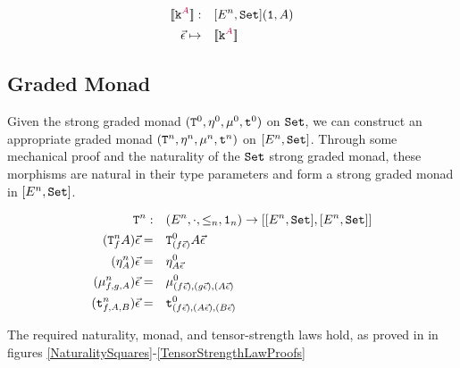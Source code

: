     \begin{align*}
        {\bf [\![}\texttt{k}^{\color{purple} A}{\bf ]\!]}:&\quad[E^n, \texttt{Set}](\texttt{1}, A)\\
        \vec{\epsilon}\mapsto&\quad{\bf [\![}\texttt{k}^{\color{purple} A}{\bf ]\!]}
    \end{align*}
    
    \subsection{Graded Monad}\label{NaturalityAndMonadLawsProof}
    Given the strong graded monad $(\texttt{T}^0_{}, \eta_{}^0{}{}, \mu^0, \texttt{t}^0)$ on $\texttt{Set}$, we can construct an appropriate graded monad $(\texttt{T}^n_{}, \eta_{}^n{}{}, \mu^n,\texttt{t}^n)$ on $[E^n, \texttt{Set}]$. Through some mechanical proof and the naturality of the $\texttt{Set}$ strong graded monad, these morphisms are natural in their type parameters and form a strong graded monad in $[E^n, \texttt{Set}]$.
    
    \begin{align*}
        \texttt{T}^n_{}:&\quad(E^n, \cdot, \leq_n, \texttt{1}_n) \rightarrow [[E^n, \texttt{Set}], [E^n, \texttt{Set}]]\\
        (\texttt{T}^n_{f}A)\vec{\epsilon}=&\quad \texttt{T}^0_{(f\vec{\epsilon})}A\vec{\epsilon}\\
        (\eta_{A}^n)\vec{\epsilon}=&\quad\eta_{A\vec{\epsilon}}^0\\
        (\mu_{f, g, A}^n)\vec{\epsilon}=&\quad\mu_{(f\vec{\epsilon}), (g\vec{\epsilon}), (A\vec{\epsilon})}^0\\
        (\texttt{t}_{f, A, B}^n)\vec{\epsilon}=&\quad\texttt{t}_{(f\vec{\epsilon}), (A\vec{\epsilon}), (B\vec{\epsilon})}^0
    \end{align*}
    
    The required naturality, monad, and tensor-strength laws hold, as proved in in figures \ref{NaturalitySquares}-\ref{TensorStrengthLawProofs}
    
    
    
